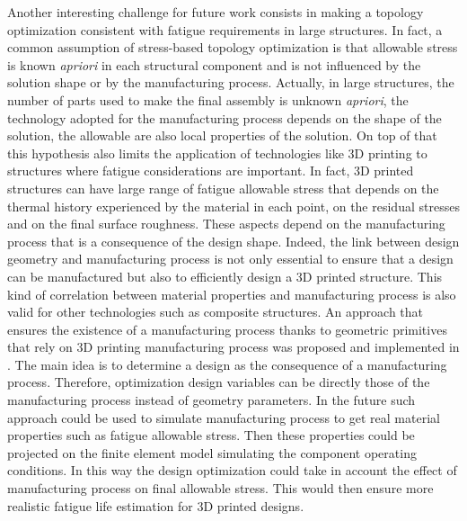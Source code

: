 Another interesting challenge for future work consists in making a topology optimization consistent with fatigue requirements in large structures. In fact, a common assumption of stress-based topology optimization is that allowable stress is known \textit{apriori} in each structural component and is not influenced by the solution shape or by the manufacturing process. Actually, in large structures, the number of parts used to make the final assembly is unknown \textit{apriori}, the technology adopted for the manufacturing process depends on the shape of the solution, the allowable are also local properties of the solution. On top of that this hypothesis also limits the application of technologies like 3D printing to structures where fatigue considerations are important. In fact, 3D printed structures can have large range of fatigue allowable stress that depends on the thermal history experienced by the material in each point, on the residual stresses and on the final surface roughness. These aspects depend on the manufacturing process that is a consequence of the design shape. Indeed, the link between design geometry and manufacturing process is not only essential to ensure that a design can be manufactured but also to efficiently design a 3D printed structure. This kind of correlation between material properties and manufacturing process is also valid for other technologies such as composite structures. An approach that ensures the existence of a manufacturing process thanks to geometric primitives that rely on 3D printing manufacturing process was proposed and implemented in \cite{vilas2019Une}. The main idea is to determine a design as the consequence of a manufacturing process. Therefore, optimization design variables can be directly those of the manufacturing process instead of geometry parameters. In the future such approach could be used to simulate manufacturing process to get real material properties such as fatigue allowable stress. Then these properties could be projected on the finite element model simulating the component operating conditions. In this way the design optimization could take in account the effect of manufacturing process on final allowable stress. This would then ensure more realistic fatigue life estimation for 3D printed designs.


